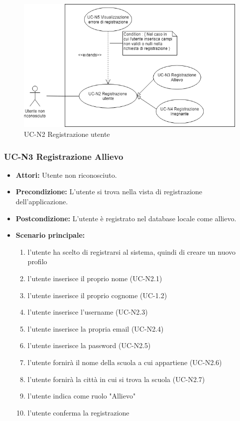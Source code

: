 \begin{figure}[h]
	\centering
	\includegraphics[scale=0.7]{images/UC-N2.png}
	\caption{UC-N2 Registrazione utente}
\end{figure}

\subsubsection{UC-N3 Registrazione Allievo}
\begin{itemize}
	\item \textbf{Attori: }Utente non riconosciuto.
	\item \textbf{Precondizione: }L'utente si trova nella vista di registrazione dell'applicazione.
	\item \textbf{Postcondizione: }L'utente è registrato nel database locale come allievo.
	\item \textbf{Scenario principale: }
		\begin{enumerate}
		\item l'utente ha scelto di registrarsi al sistema, quindi di creare un nuovo profilo
		\item l'utente inserisce il proprio nome (UC-N2.1)
		\item l'utente inserisce il proprio cognome (UC-1.2)
		\item l'utente inserisce l'username (UC-N2.3)
		\item l'utente inserisce la propria email (UC-N2.4)
		\item l'utente inserisce la password (UC-N2.5)
		\item l'utente fornirà il nome della scuola a cui appartiene (UC-N2.6)
		\item l'utente fornirà la città in cui si trova la scuola (UC-N2.7)
		\item l'utente indica come ruolo "Allievo"
		\item l'utente conferma la registrazione
		\end{enumerate}
\end{itemize}

